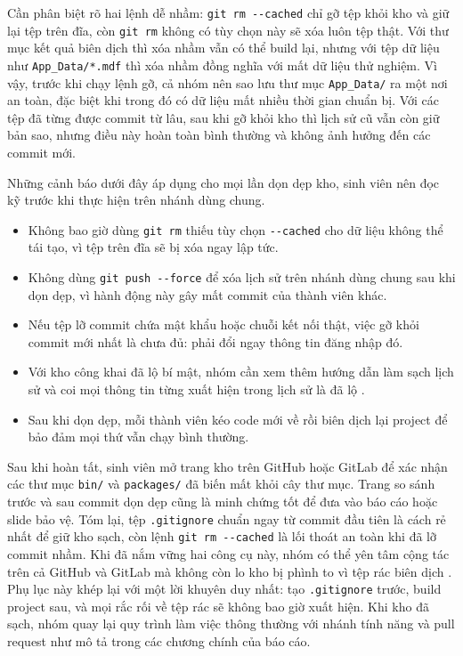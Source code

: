 Cần phân biệt rõ hai lệnh dễ nhầm: \verb|git rm --cached| chỉ gỡ tệp khỏi kho và giữ lại tệp trên đĩa, còn \verb|git rm| không có tùy chọn này sẽ xóa luôn tệp thật.
Với thư mục kết quả biên dịch thì xóa nhầm vẫn có thể build lại, nhưng với tệp dữ liệu như \verb|App_Data/*.mdf| thì xóa nhầm đồng nghĩa với mất dữ liệu thử nghiệm.
Vì vậy, trước khi chạy lệnh gỡ, cả nhóm nên sao lưu thư mục \verb|App_Data/| ra một nơi an toàn, đặc biệt khi trong đó có dữ liệu mất nhiều thời gian chuẩn bị.
Với các tệp đã từng được commit từ lâu, sau khi gỡ khỏi kho thì lịch sử cũ vẫn còn giữ bản sao, nhưng điều này hoàn toàn bình thường và không ảnh hưởng đến các commit mới.

Những cảnh báo dưới đây áp dụng cho mọi lần dọn dẹp kho, sinh viên nên đọc kỹ trước khi thực hiện trên nhánh dùng chung.

\begin{itemize}
\item Không bao giờ dùng \verb|git rm| thiếu tùy chọn \verb|--cached| cho dữ liệu không thể tái tạo, vì tệp trên đĩa sẽ bị xóa ngay lập tức.
\item Không dùng \verb|git push --force| để xóa lịch sử trên nhánh dùng chung sau khi dọn dẹp, vì hành động này gây mất commit của thành viên khác.
\item Nếu tệp lỡ commit chứa mật khẩu hoặc chuỗi kết nối thật, việc gỡ khỏi commit mới nhất là chưa đủ: phải đổi ngay thông tin đăng nhập đó.
\item Với kho công khai đã lộ bí mật, nhóm cần xem thêm hướng dẫn làm sạch lịch sử và coi mọi thông tin từng xuất hiện trong lịch sử là đã lộ \cite{githubdocs,gitlabdocs}.
\item Sau khi dọn dẹp, mỗi thành viên kéo code mới về rồi biên dịch lại project để bảo đảm mọi thứ vẫn chạy bình thường.
\end{itemize}

Sau khi hoàn tất, sinh viên mở trang kho trên GitHub hoặc GitLab để xác nhận các thư mục \verb|bin/| và \verb|packages/| đã biến mất khỏi cây thư mục.
Trang so sánh trước và sau commit dọn dẹp cũng là minh chứng tốt để đưa vào báo cáo hoặc slide bảo vệ.
Tóm lại, tệp \verb|.gitignore| chuẩn ngay từ commit đầu tiên là cách rẻ nhất để giữ kho sạch, còn lệnh \verb|git rm --cached| là lối thoát an toàn khi đã lỡ commit nhầm.
Khi đã nắm vững hai công cụ này, nhóm có thể yên tâm cộng tác trên cả GitHub và GitLab mà không còn lo kho bị phình to vì tệp rác biên dịch \cite{progit,githubdocs,gitlabdocs}.
Phụ lục này khép lại với một lời khuyên duy nhất: tạo \verb|.gitignore| trước, build project sau, và mọi rắc rối về tệp rác sẽ không bao giờ xuất hiện.
Khi kho đã sạch, nhóm quay lại quy trình làm việc thông thường với nhánh tính năng và pull request như mô tả trong các chương chính của báo cáo.
